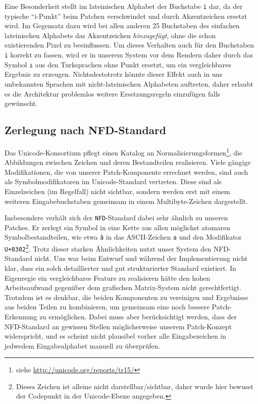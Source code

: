 \documentclass[11pt,a4paper]{article}
\begin{document}
Eine Besonderheit stellt im lateinischen Alphabet der Buchstabe \texttt{i} dar, da der typische \enquote{i-Punkt} beim Patchen verschwindet und durch Akzentzeichen ersetzt wird. Im Gegensatz dazu wird bei allen anderen 25 Buchstaben des einfachen lateinischen Alphabets das Akzentzeichen \textit{hinzugefügt}, ohne die schon existierenden Pixel zu beeinflussen. Um dieses Verhalten auch für den Buchstaben \texttt{i} korrekt zu fassen, wird er in unserem System vor dem Rendern daher durch das Symbol \texttt{ı} aus den Turksprachen ohne Punkt ersetzt, um ein vergleichbares Ergebnis zu erzeugen. Nichtsdestotrotz könnte dieser Effekt auch in uns unbekannten Sprachen mit nicht-lateinischen Alphabeten auftreten, daher erlaubt es die Architektur problemlos weitere Ersetzungsregeln einzufügen falls gewünscht.

\subsection{Zerlegung nach NFD-Standard}
\label{sec:nfd}
Das Unicode-Konsortium pflegt einen Katalog an Normalisierungsformen\footnote{siehe \url{http://unicode.org/reports/tr15/}}, die Abbildungen zwischen Zeichen und deren Bestandteilen realisieren. Viele gängige Modifikationen, die von unserer Patch-Komponente errechnet werden, sind auch als Symbolmodifikatoren im Unicode-Standard vertreten. Diese sind als Einzelzeichen (im Regelfall) nicht sichtbar, sondern werden erst mit einem weiteren Eingabebuchstaben gemeinsam in einem Multibyte-Zeichen dargestellt.

Insbesondere verhält sich der \texttt{NFD}-Standard dabei sehr ähnlich zu unseren Patches. Er zerlegt ein Symbol in eine Kette aus allen möglichst atomaren Symbolbestandteilen, wie etwa \texttt{â} in das ASCII-Zeichen \texttt{a} und den Modifikator \texttt{U+0302}\footnote{Dieses Zeichen ist alleine nicht darstellbar/sichtbar, daher wurde hier bewusst der Codepunkt in der Unicode-Ebene angegeben.}.
Trotz dieser starken Ähnlichkeiten nutzt unser System den NFD-Standard nicht. Uns war beim Entwurf und während der Implementierung nicht klar, dass ein solch detaillierter und gut strukturierter Standard existiert. In Eigenregie ein vergleichbares Feature zu realisieren hätte den hohen Arbeitsaufwand gegenüber dem grafischen Matrix-System nicht gerechtfertigt. Trotzdem ist es denkbar, die beiden Komponenten zu vereinigen und Ergebnisse aus beiden Teilen zu kombinieren, um gemeinsam eine noch bessere Patch-Erkennung zu ermöglichen. Dabei muss aber berücksichtigt werden, dass der NFD-Standard an gewissen Stellen möglicherweise unserem Patch-Konzept widerspricht, und es scheint nicht plausibel vorher alle Eingabezeichen in jedwedem Eingabealphabet manuell zu überprüfen.
\end{document}
